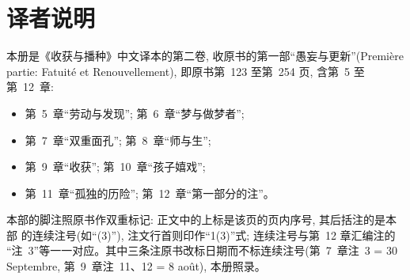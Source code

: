 \documentclass[
    PaperSize=a4paper,
    HeadingFont=hei,
    Biblatex=false,
    BookTitleCN={收获与播种},
    Translator={数译},
    LogoFile=logo.pdf
]{mathtranslation}
\begin{document}
\frontmatter
\makecover

\chapter*{译者说明}

本册是《收获与播种》中文译本的第二卷, 收原书的第一部“愚妄与更新”(Première
partie: Fatuité et Renouvellement), 即原书第~123 至第~254 页, 含第~5 至第~12~章:

\begin{itemize}
  \item 第~5~章“劳动与发现”;  第~6~章“梦与做梦者”;
  \item 第~7~章“双重面孔”;    第~8~章“师与生”;
  \item 第~9~章“收获”;        第~10~章“孩子嬉戏”;
  \item 第~11~章“孤独的历险”; 第~12~章“第一部分的注”。
\end{itemize}

本部的脚注照原书作双重标记: 正文中的上标是该页的页内序号, 其后括注的是本部
的连续注号(如“(3)”), 注文行首则印作“1(3)”式; 连续注号与第~12 章汇编注的
“注~3”等一一对应。其中三条注原书改标日期而不标连续注号(第~7~章注~3 =
30 Septembre, 第~9~章注~11、12 = 8 août), 本册照录。

\CommonNoteBody

\makecontents

\mainmatter


\dedication{%
献给曾是我的长辈的人,\\[0.5em]
他们手足般地接纳我\\[0.5em]
进入那个曾属于他们、\\[0.5em]
而后也成为我的世界。\\[2em]
献给曾是我的学生的人,\\[0.5em]
我给了他们我身上最好的\\[0.5em]
——也给了最坏的……%
}

\setcounter{chapter}{4}













\end{document}
